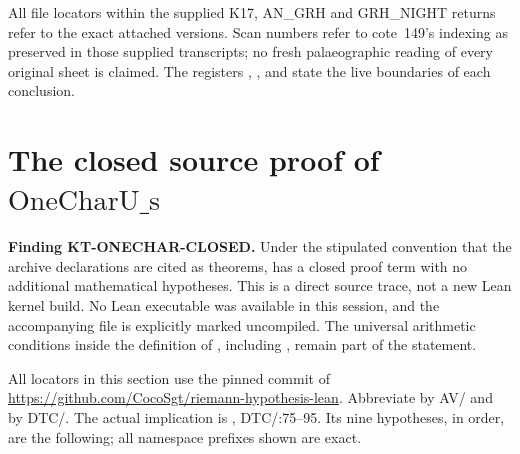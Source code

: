 \documentclass[11pt,a4paper]{article}
\theoremstyle{definition}
\renewcommand{\paragraph}[1]{\par\smallskip\noindent\textbf{#1}\quad\ignorespaces}
\begin{document}
All file locators within the supplied K17, AN\_GRH and GRH\_NIGHT
returns refer to the exact attached versions. Scan numbers refer
to cote~149's indexing as preserved in those supplied transcripts;
no fresh palaeographic reading of every original sheet is claimed.
The registers , , and
 state the live boundaries of each conclusion.



\section{The closed source proof of \texorpdfstring{$\mathrm{OneCharU\_s}$}{OneCharU\_s}}
\label{sec:kt-onechar-closed}

\paragraph{Finding KT-ONECHAR-CLOSED.}
Under the stipulated convention that the archive declarations are cited as
theorems,  has a closed proof term with
no additional mathematical hypotheses.  This is a direct source trace,
not a new Lean kernel build.  No Lean executable was available in this
session, and the accompanying file
 is explicitly marked uncompiled.
The universal arithmetic conditions inside the definition of
, including , remain part of the statement.

All locators in this section use the pinned commit
 of
\url{https://github.com/CocoSgt/riemann-hypothesis-lean}.
Abbreviate
by AV/ and
by DTC/.  The actual implication is
,
DTC/:75--95.  Its nine hypotheses, in order, are
the following; all namespace prefixes shown are exact.
\end{document}
